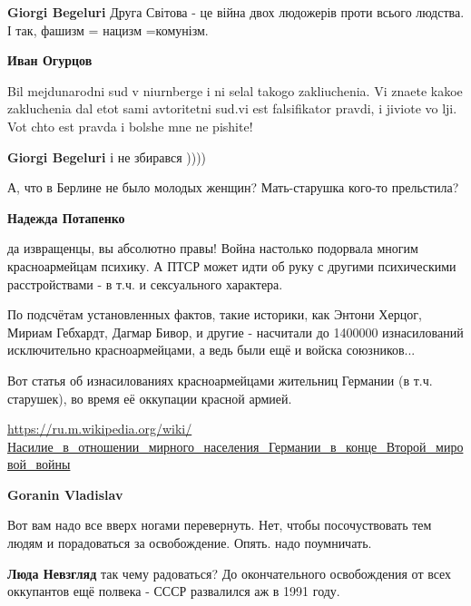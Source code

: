 \begin{itemize}
\begin{itemize}
\begin{itemize} %
\textbf{Giorgi Begeluri} Друга Світова - це війна двох людожерів проти всього людства. І так, фашизм = нацизм =комунізм.

\textbf{Иван Огурцов}

Bil mejdunarodni sud v niurnberge i ni selal takogo zakliuchenia. Vi znaete
kakoe zakluchenia dal etot sami avtoritetni sud.vi est falsifikator pravdi, i
jiviote vo lji. Vot chto est pravda i bolshe mne ne pishite!

\textbf{Giorgi Begeluri} і не збирався ))))

\end{itemize} %

А, что в Берлине не было молодых женщин? Мать-старушка кого-то прельстила?

\begin{itemize} %
\textbf{Надежда Потапенко} 

да извращенцы, вы абсолютно правы! Война настолько подорвала многим
красноармейцам психику. А ПТСР может идти об руку с другими психическими
расстройствами - в т.ч. и сексуального характера.

По подсчётам установленных фактов, такие историки, как Энтони Херцог, Мириам
Гебхардт, Дагмар Бивор, и другие - насчитали до 1400000 изнасилований
исключительно красноармейцами, а ведь были ещё и войска союзников...

Вот статья об изнасилованиях красноармейцами жительниц Германии (в т.ч.
старушек), во время её оккупации красной армией.

\url{https://ru.m.wikipedia.org/wiki/Насилие_в_отношении_мирного_населения_Германии_в_конце_Второй_мировой_войны}

\end{itemize} %

\textbf{Goranin Vladislav} 

Вот вам надо все вверх ногами перевернуть. Нет, чтобы посочуствовать тем людям
и порадоваться за освобождение. Опять. надо поумничать.


\textbf{Люда Невзгляд} так чему радоваться? До окончательного освобождения от всех оккупантов ещё полвека - СССР развалился аж в 1991 году.

\end{itemize} %



\end{itemize}
